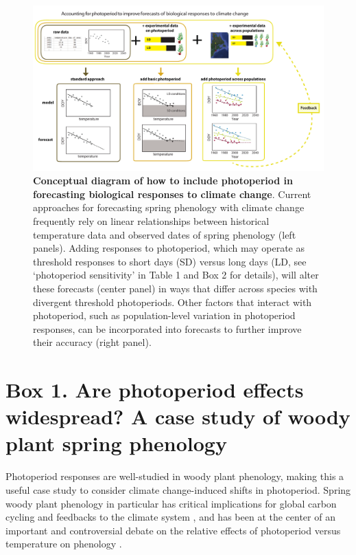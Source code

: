 \documentclass{article}
\begin{document}
\begin{figure}[h]
\includegraphics{photocondiag6.pdf} 
\caption{\textbf{Conceptual diagram of how to include photoperiod in forecasting biological responses to climate change}. Current approaches for forecasting spring phenology with climate change frequently rely on linear relationships between historical temperature data and observed dates of spring phenology (left panels). Adding responses to photoperiod, which may operate as threshold responses to short days (SD) versus long days (LD, see `photoperiod sensitivity' in Table 1 and Box 2 for details), will alter these forecasts (center panel) in ways that differ across species with divergent threshold photoperiods. Other factors that interact with photoperiod, such as population-level variation in photoperiod responses, can be incorporated into forecasts to further improve their accuracy (right panel).}
 \label{fig:condiag}
 \end{figure}
\clearpage

 
 \section*{Box 1. Are photoperiod effects widespread? A case study of woody plant spring phenology}
\par Photoperiod responses are well-studied in woody plant phenology, making this a useful case study to consider climate change-induced shifts in photoperiod. Spring woody plant phenology in particular has critical implications for global carbon cycling and feedbacks to the climate system \citep{richardson2013}, and has been at the center of an important and controversial debate on the relative effects of photoperiod versus temperature on phenology \citep[e.g.,][]{fu2019,chuine2010,koerner2010a,koerner2010b}. 
\end{document}
